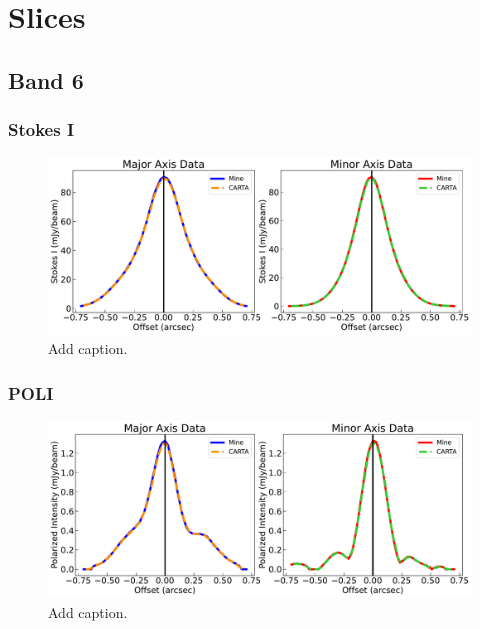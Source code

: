 \chapter{Slices}
\label{ch3}

\section{Band 6}
\subsection{Stokes I}
\begin{figure}[h]
  \centering
  \includegraphics[width=1.1\textwidth]{WRITEUP_AND_IMAGES/IMAGES/IRS63_StokesI_slice_BAND6.pdf}
  \caption{Add caption.}
  \label{fig: }
\end{figure}


\subsection{POLI}
\begin{figure}[h]
  \centering
  \includegraphics[width=1.1\textwidth]{WRITEUP_AND_IMAGES/IMAGES/IRS63_POLI_slice_BAND6.pdf}
  \caption{Add caption.}
  \label{fig: }
\end{figure}
